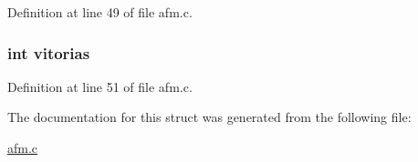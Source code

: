 \-Definition at line 49 of file afm.\-c.

\hypertarget{structequipa_a1fe4593c9060bf2d8f69a78b9af1f60b}{
\subsubsection[{vitorias}]{\setlength{\rightskip}{0pt plus 5cm}int {\bf vitorias}}}\label{structequipa_a1fe4593c9060bf2d8f69a78b9af1f60b}


\-Definition at line 51 of file afm.\-c.



\-The documentation for this struct was generated from the following file\-:\begin{DoxyCompactItemize}
\item 
\hyperlink{afm_8c}{afm.\-c}\end{DoxyCompactItemize}
